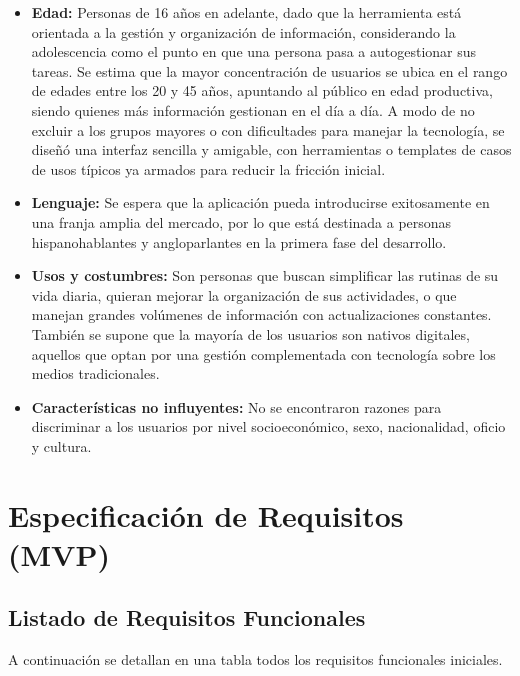 \begin{itemize}
  \item \textbf{Edad:} Personas de 16 años en adelante, dado que la herramienta está orientada a la gestión y organización de información, considerando la adolescencia como el punto en que una persona pasa a autogestionar sus tareas. Se estima que la mayor concentración de usuarios se ubica en el rango de edades entre los 20 y 45 años, apuntando al público en edad productiva, siendo quienes más información gestionan en el día a día. A modo de no excluir a los grupos mayores o con dificultades para manejar la tecnología, se diseñó una interfaz sencilla y amigable, con herramientas o templates de casos de usos típicos ya armados para reducir la fricción inicial.
  \item \textbf{Lenguaje:} Se espera que la aplicación pueda introducirse exitosamente en una franja amplia del mercado, por lo que está destinada a personas hispanohablantes y angloparlantes en la primera fase del desarrollo.
  \item \textbf{Usos y costumbres:} Son personas que buscan simplificar las rutinas de su vida diaria, quieran mejorar la organización de sus actividades, o que manejan grandes volúmenes de información con actualizaciones constantes. También se supone que la mayoría de los usuarios son nativos digitales, aquellos que optan por una gestión complementada con tecnología sobre los medios tradicionales.
  \item \textbf{Características no influyentes:} No se encontraron razones para discriminar a los usuarios por nivel socioeconómico, sexo, nacionalidad, oficio y cultura.
\end{itemize}

\section{Especificación de Requisitos (MVP)}

\subsection{Listado de Requisitos Funcionales}
A continuación se detallan en una tabla todos los requisitos funcionales iniciales.

